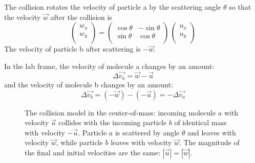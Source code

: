 {The collision rotates the velocity of particle a by the scattering angle $\theta$ so that the velocity $\vec{w}$ after the collision is
\begin{displaymath}
\begin{pmatrix}
w_x \\
w_y \\
\end{pmatrix}
  =
\begin{pmatrix}
\cos \theta  & -\sin \theta \\
\sin \theta  & \cos \theta \\
\end{pmatrix}
\,
\begin{pmatrix}
u_x \\
u_y \\
\end{pmatrix}
\end{displaymath}
The velocity of particle b after scattering is $-\vec{w}$.

In the lab frame, the velocity of molecule a changes by an amount:
\begin{displaymath}
\Delta \vec{v_a} = \vec{w} - \vec{u}  
\end{displaymath}
and the velocity of molecule b changes by an amount:
\begin{displaymath}
\Delta \vec{v_b} = (-\vec{w}) - (-\vec{u}) = -\Delta \vec{v_a}
\end{displaymath}

\begin{figure}[htbp]
\begin{center}
\caption{The collision model in the center-of-mass:  incoming molecule $a$ with velocity $\vec{u}$ collides with the incoming particle $b$ of identical mass with velocity $-\vec{u}$.  Particle $a$ is scattered by angle $\theta$ and leaves with velocity $\vec{w}$, while particle $b$ leaves with velocity $\vec{w}$.  The magnitude of the final and initial velocities are the same:  $|\vec{u}| = |\vec{w}|$.}
\label{fig:collcms}
\end{center}
\end{figure}

}
